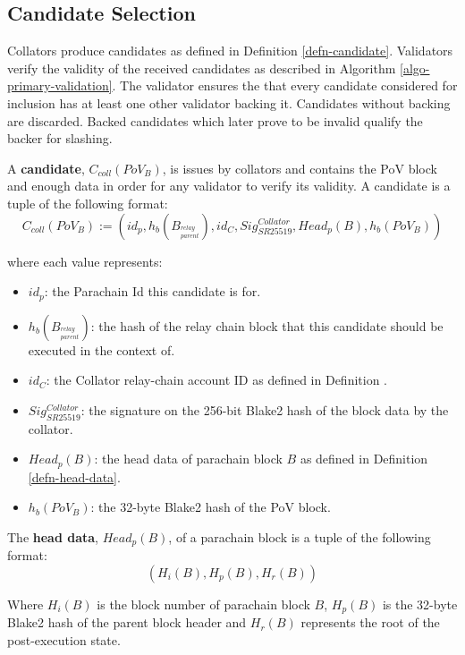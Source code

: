 \subsection{Candidate Selection}
\label{sect-primary-validation}

Collators produce candidates as defined in Definition \ref{defn-candidate}.
Validators verify the validity of the received candidates as described in
Algorithm \ref{algo-primary-validation}. The validator ensures the that every
candidate considered for inclusion has at least one other validator backing it.
Candidates without backing are discarded. Backed candidates which later prove to
be invalid qualify the backer for slashing.
\newline

\begin{definition}
  \label{defn-candidate}
  A \textbf{candidate}, $C_{coll}(PoV_B)$, is issues by collators and contains the PoV
  block and enough data in order for any validator to verify its validity. A
  candidate is a tuple of the following format:
  \[
  C_{coll}(PoV_B) := (id_p, h_b({B_{^{relay}_{parent}}}), id_{C}, Sig^{Collator}_{SR25519}, Head_p(B), h_b({PoV_B}))
  \]

  where each value represents:
  \begin{itemize}
    \item $id_p$: the Parachain Id this candidate is for.
    \item $h_b({B_{^{relay}_{parent}}})$: the hash of the relay chain block that this
    candidate should be executed in the context of.
    \item $id_C$: the Collator relay-chain account ID as defined in Definition
    .
    \item $Sig^{Collator}_{SR25519}$: the signature on the 256-bit Blake2 hash
    of the block data by the collator.
    \item $Head_p(B)$: the head data of parachain block $B$ as defined in
    Definition \ref{defn-head-data}.
    \item $h_b({PoV_B})$: the 32-byte Blake2 hash of the PoV block.
  \end{itemize}

\end{definition}

\begin{definition}
  \label{defn-head-data}
  The \textbf{head data}, $Head_p(B)$, of a parachain block is a tuple of the following format:
  \[
    (H_i(B), H_p(B), H_r(B))
  \]

  Where $H_i(B)$ is the block number of parachain block $B$, $H_p(B)$ is the
  32-byte Blake2 hash of the parent block header and $H_r(B)$ represents the
  root of the post-execution state.
\end{definition}

